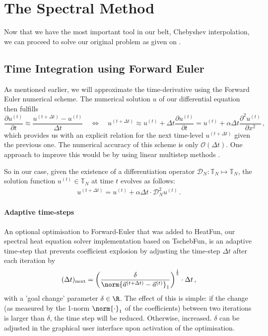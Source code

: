 \documentclass[12pt, a4paper]{article}
\newcommand{\chebyshev}{Chebyshev\xspace}
\newcommand{\tschebfun}{\textcolor{themecolor3}{TschebFun}\xspace}
\newcommand{\heatfun}{\textcolor{themecolor3}{HeatFun}\xspace}
\begin{document}

  \section{The Spectral Method}
  Now that we have the most important tool in our belt, \chebyshev interpolation, we can proceed to solve our original problem as given on .

  \subsection{Time Integration using Forward Euler}
  As mentioned earlier, we will approximate the time-derivative using the Forward Euler numerical scheme.
  The numerical solution $u$ of our differential equation then fulfills
  $$\frac{\partial u^{(t)}}{\partial t} \approx \frac{u^{(t+\Delta t)} - u^{(t)}}{\Delta t} \quad\Leftrightarrow\quad u^{(t+\Delta t)} \approx u^{(t)} + \Delta t \frac{\partial u^{(t)}}{\partial t} = u^{(t)} + \alpha \Delta t \frac{\partial^2 u^{(t)}}{\partial x^2} \,,$$
  which provides us with an explicit relation for the next time-level $u^{(t+\Delta t)}$ given the previous one.
  The numerical accuracy of this scheme is only $\mathcal{O}(\Delta t)$.
  One approach to improve this would be by using linear multistep methods \parencite{süli_mayers_2003}.

  So in our case, given the existence of a differentiation operator $\mathcal{D}_N: \mathbb{T}_N \mapsto \mathbb{T}_N$, the solution function $u^{(t)} \in \mathbb{T}_N$ at time $t$ evolves as follows:
  \begin{align*}
    u^{(t+\Delta t)} = u^{(t)} + \alpha \Delta t \cdot \mathcal{D}_N^2 u^{(t)} \,.
  \end{align*}

  \paragraph{Adaptive time-steps}
  An optional optimisation to Forward-Euler that was added to \heatfun, our spectral heat equation solver implementation based on \tschebfun, is an adaptive time-step that prevents coefficient explosion by adjusting the time-step $\Delta t$ after each iteration by
  $$(\Delta t)_{\text{next}} = \left(\frac{\delta}{\norm{\vec{a}^{(t+\Delta t)} - \vec{a}^{(t)}}_1}\right)^{\frac{1}{5}} \cdot \Delta t \,,$$
  with a 'goal change' parameter $\delta \in \R$.
  The effect of this is simple: if the change (as measured by the 1-norm $\norm{\cdot}_1$ of the coefficients) between two iterations is larger than $\delta$, the time step will be reduced. Otherwise, increased.
  $\delta$ can be adjusted in the graphical user interface upon activation of the optimisation.
\end{document}
